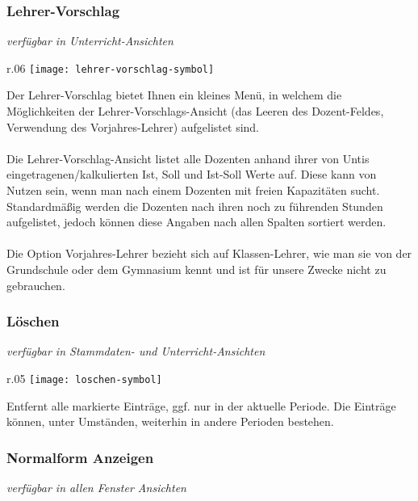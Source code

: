 \subsubsection{Lehrer-Vorschlag}
{\small\textit{verfügbar in Unterricht-Ansichten\\}\par}

\begin{wrapfigure}{r}{.06\textwidth}
	\vspace{-50pt}
	\texttt{[image: lehrer-vorschlag-symbol]}
	\vspace{-35pt}
\end{wrapfigure}

\noindent
Der Lehrer-Vorschlag bietet Ihnen ein kleines Menü, in welchem die Möglichkeiten der Lehrer-Vorschlags-Ansicht (das Leeren des Dozent-Feldes, Verwendung des Vorjahres-Lehrer) aufgelistet sind.\\
\\
Die Lehrer-Vorschlag-Ansicht listet alle Dozenten anhand ihrer von Untis eingetragenen/kalkulierten Ist, Soll und Ist-Soll Werte auf. Diese kann von Nutzen sein, wenn man nach einem Dozenten mit freien Kapazitäten sucht. Standardmäßig werden die Dozenten nach ihren noch zu führenden Stunden aufgelistet, jedoch können diese Angaben nach allen Spalten sortiert werden.\\
\\
Die Option Vorjahres-Lehrer bezieht sich auf Klassen-Lehrer, wie man sie von der Grundschule oder dem Gymnasium kennt und ist für unsere Zwecke nicht zu gebrauchen.

\subsubsection{Löschen}
{\small\textit{verfügbar in Stammdaten- und Unterricht-Ansichten\\}\par}

\begin{wrapfigure}{r}{.05\textwidth}
	\vspace{-50pt}
	\texttt{[image: loschen-symbol]}
	\vspace{-35pt}
\end{wrapfigure}

\noindent %
Entfernt alle markierte Einträge, ggf. nur in der aktuelle Periode. Die Einträge können, unter Umständen, weiterhin in andere Perioden bestehen.

\subsubsection{Normalform Anzeigen}
{\small\textit{verfügbar in allen Fenster Ansichten\\}\par}

